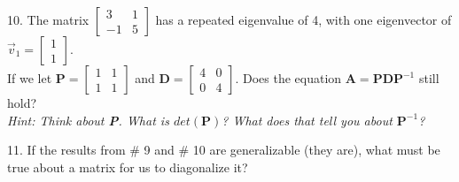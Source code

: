 \documentclass{article}
\begin{document}
\begin{flushleft}
\vspace{2.5in}

10. The matrix $\begin{bmatrix} 3 & 1 \\ -1 & 5 \end{bmatrix}$ has a repeated eigenvalue of 4, with one eigenvector of $\vec{v}_1=\begin{bmatrix} 1 \\ 1 \end{bmatrix}$. \\
If we let $\textbf{P}=\begin{bmatrix} 1 & 1 \\ 1 & 1 \end{bmatrix}$ and $\textbf{D} = \begin{bmatrix} 4 & 0 \\ 0 & 4 \end{bmatrix}$. Does the equation $\textbf{A} = \textbf{PDP}^{-1}$ still hold? \\

\textit{ Hint: Think about \textbf{P}. What is $det(\textbf{P})$? What does that tell you about $\textbf{P}^{-1}$? }

\vspace{2in}

11. If the results from \# 9 and \# 10 are generalizable (they are), what must be true about a matrix for us to diagonalize it?

\vspace{1in}

%
%
%
%
%
%
%


\end{flushleft}
\end{document}
